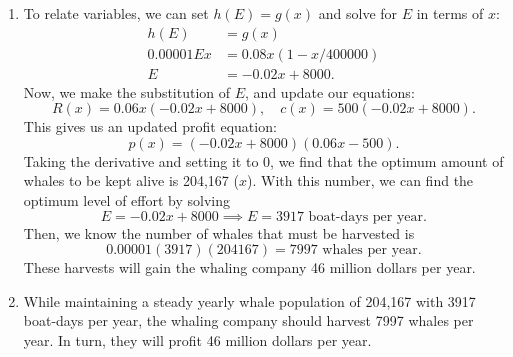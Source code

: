 \documentclass[12pt, oneside]{book}
\begin{document}
\begin{enumerate}
\begin{enumerate}
{\begin{enumerate}[label=(\arabic*)]
                \item To relate variables, we can set \(h(E) = g(x)\) and solve for \(E\) in terms of \(x\): 
                \begin{align*}
                    h(E) &= g(x) \\
                    0.00001Ex &= 0.08x(1 - x/400000) \\
                    E &= -0.02x + 8000.
                \end{align*}
                Now, we make the substitution of \(E\), and update our equations:
                \[
                    R(x) = 0.06x \left(-0.02x + 8000\right), \quad c(x) = 500\left(-0.02x + 8000\right).
                \]
                This gives us an updated profit equation:
                \[
                    p(x) = \left(-0.02x + 8000\right)(0.06x - 500).
                \]
                Taking the derivative and setting it to 0, we find that the optimum amount of whales to be kept alive is 204,167 (\(x\)). With this number, we can find the optimum level of effort by solving
                \[
                    E = -0.02x + 8000 \implies E = 3917 \text{ boat-days per year.}
                \]
                Then, we know the number of whales that must be harvested is 
                \[
                    0.00001(3917)(204167) = 7997 \text{ whales per year.}
                \]
                These harvests will gain the whaling company 46 million dollars per year.
                \item While maintaining a steady yearly whale population of 204,167 with 3917 boat-days per year, the whaling company should harvest 7997 whales per year. In turn, they will profit 46 million dollars per year. 
            \end{enumerate}
        }
    \end{enumerate}
\end{enumerate}

\newpage
\end{document}
